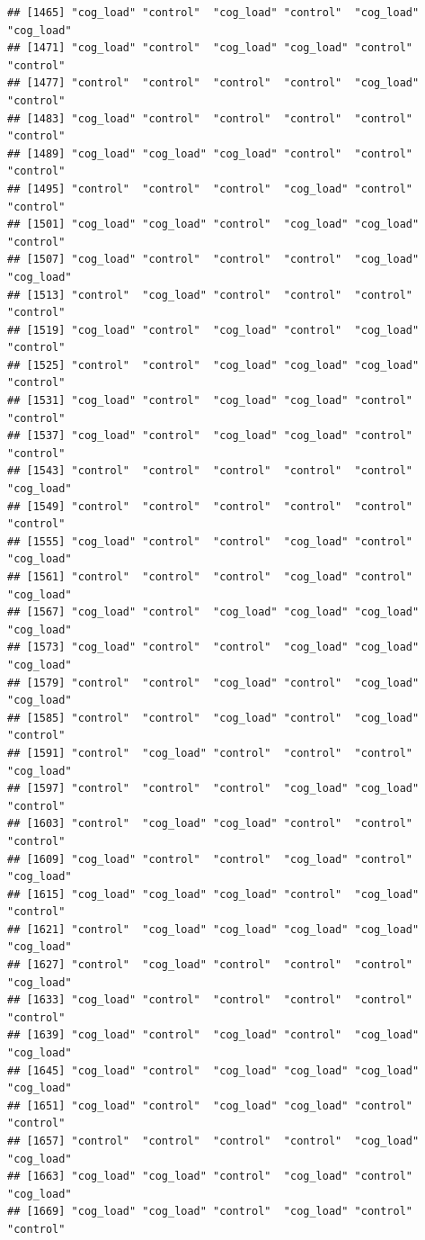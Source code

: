 \documentclass[
  american,
  man,floatsintext]{apa7}
\begin{document}
\begin{verbatim}
## [1465] "cog_load" "control"  "cog_load" "control"  "cog_load" "cog_load"
## [1471] "cog_load" "control"  "cog_load" "cog_load" "control"  "control" 
## [1477] "control"  "control"  "control"  "control"  "cog_load" "control" 
## [1483] "cog_load" "control"  "control"  "control"  "control"  "control" 
## [1489] "cog_load" "cog_load" "cog_load" "control"  "control"  "control" 
## [1495] "control"  "control"  "control"  "cog_load" "control"  "control" 
## [1501] "cog_load" "cog_load" "control"  "cog_load" "cog_load" "control" 
## [1507] "cog_load" "control"  "control"  "control"  "cog_load" "cog_load"
## [1513] "control"  "cog_load" "control"  "control"  "control"  "control" 
## [1519] "cog_load" "control"  "cog_load" "control"  "cog_load" "control" 
## [1525] "control"  "control"  "cog_load" "cog_load" "cog_load" "control" 
## [1531] "cog_load" "control"  "cog_load" "cog_load" "control"  "control" 
## [1537] "cog_load" "control"  "cog_load" "cog_load" "control"  "control" 
## [1543] "control"  "control"  "control"  "control"  "control"  "cog_load"
## [1549] "control"  "control"  "control"  "control"  "control"  "control" 
## [1555] "cog_load" "control"  "control"  "cog_load" "control"  "cog_load"
## [1561] "control"  "control"  "control"  "cog_load" "control"  "cog_load"
## [1567] "cog_load" "control"  "cog_load" "cog_load" "cog_load" "cog_load"
## [1573] "cog_load" "control"  "control"  "cog_load" "cog_load" "cog_load"
## [1579] "control"  "control"  "cog_load" "control"  "cog_load" "cog_load"
## [1585] "control"  "control"  "cog_load" "control"  "cog_load" "control" 
## [1591] "control"  "cog_load" "control"  "control"  "control"  "cog_load"
## [1597] "control"  "control"  "control"  "cog_load" "cog_load" "control" 
## [1603] "control"  "cog_load" "cog_load" "control"  "control"  "control" 
## [1609] "cog_load" "control"  "control"  "cog_load" "control"  "cog_load"
## [1615] "cog_load" "cog_load" "cog_load" "control"  "cog_load" "control" 
## [1621] "control"  "cog_load" "cog_load" "cog_load" "cog_load" "cog_load"
## [1627] "control"  "cog_load" "control"  "control"  "control"  "cog_load"
## [1633] "cog_load" "control"  "control"  "control"  "control"  "control" 
## [1639] "cog_load" "control"  "cog_load" "control"  "cog_load" "cog_load"
## [1645] "cog_load" "control"  "cog_load" "cog_load" "cog_load" "cog_load"
## [1651] "cog_load" "control"  "cog_load" "cog_load" "control"  "control" 
## [1657] "control"  "control"  "control"  "control"  "cog_load" "cog_load"
## [1663] "cog_load" "cog_load" "control"  "cog_load" "control"  "cog_load"
## [1669] "cog_load" "cog_load" "control"  "cog_load" "control"  "control" 

\end{verbatim}
\end{document}
